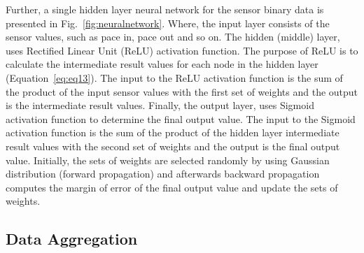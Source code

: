 \documentclass[runningheads]{llncs}
\begin{document}
Further, a single hidden layer neural network for the sensor binary data is presented in Fig.~\ref{fig:neuralnetwork}. Where, the input layer consists of the sensor values, such as pace in, pace out and so on. The hidden (middle) layer, uses Rectified Linear Unit (ReLU) activation function. The purpose of  ReLU is to calculate the intermediate result values for each node in the hidden layer (Equation~\ref{eq:eq13}). The input to the ReLU activation function is the sum of the product of the input sensor values with the first set of weights and the output is the intermediate result values. Finally, the output layer, uses Sigmoid activation function to determine the final output value. The input to the Sigmoid activation function is the sum of the product of the hidden layer intermediate result values with the second set of weights and the output is the final output value. Initially, the sets of weights are selected randomly by using Gaussian distribution (forward propagation) and afterwards backward propagation computes the margin of error of the final output value and update the sets of weights. 



\subsection {Data Aggregation}
\label{sec:aggregation}
\iffalse

When working with time-series forecasting we often have to choose between a few potential models and the best way is to test each model in pseudo-out-of-sample estimations. In other words, we simulate a forecasting situation where we drop some data from the estimation sample to see how each model perform.

A group of sensor values in a fixed sized window (15 consecutive sensor readings) are taken and convert them to an aggregated outcome in an effort to normalize the data. This pattern is then mapped into memory. Next, the current pattern is compared to all previous patterns. The pattern is compared to all the previous patterns. If their percent similarity is more than a certain threshold, then it will be considered. Afterwards, move forward one reading (row) and re-map the pattern. From here, 20-30 comparable patterns from history can be gathered. With these similar patterns, we can then aggregate all of their outcomes, and come up with an estimated "average" outcome. With that average outcome, if it is very favorable, then we might say that machine is working fine. If the outcome is not favorable, maybe we say that machine is going to “stop”.
\fi
\end{document}
